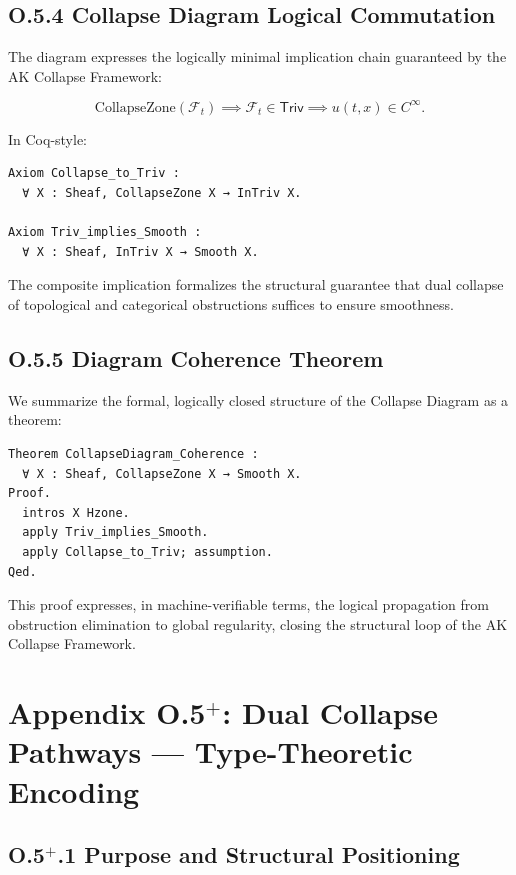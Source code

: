 \documentclass[11pt]{article}
\begin{document}
\subsection*{O.5.4 Collapse Diagram Logical Commutation}

The diagram expresses the logically minimal implication chain guaranteed by the AK Collapse Framework:

\[
\mathrm{CollapseZone}(\mathcal{F}_t)
\implies \mathcal{F}_t \in \mathsf{Triv}
\implies u(t, x) \in C^\infty.
\]

In Coq-style:

\begin{lstlisting}[language=Coq]
Axiom Collapse_to_Triv :
  ∀ X : Sheaf, CollapseZone X → InTriv X.

Axiom Triv_implies_Smooth :
  ∀ X : Sheaf, InTriv X → Smooth X.
\end{lstlisting}

The composite implication formalizes the structural guarantee that dual collapse of topological and categorical obstructions suffices to ensure smoothness.

\subsection*{O.5.5 Diagram Coherence Theorem}

We summarize the formal, logically closed structure of the Collapse Diagram as a theorem:

\begin{lstlisting}[language=Coq]
Theorem CollapseDiagram_Coherence :
  ∀ X : Sheaf, CollapseZone X → Smooth X.
Proof.
  intros X Hzone.
  apply Triv_implies_Smooth.
  apply Collapse_to_Triv; assumption.
Qed.
\end{lstlisting}

This proof expresses, in machine-verifiable terms, the logical propagation from obstruction elimination to global regularity, closing the structural loop of the AK Collapse Framework.

\section*{Appendix O.5$^+$: Dual Collapse Pathways — Type-Theoretic Encoding}

\subsection*{O.5$^+$.1 Purpose and Structural Positioning}
\end{document}

